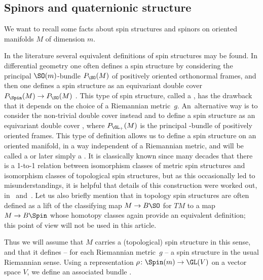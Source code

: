 \subsection{Spinors and quaternionic structure}\label{subsec.quaternionic-structures}

We want to recall some facts about spin structures and spinors on oriented manifolds $M$ of dimension $m$.

In the literature several equivalent definitions of spin structures may be found.
In differential geometry one often defines a spin structure by considering the principal $\SO(m)$-bundle $P_\SO(M)$ of positively oriented orthonormal frames, and then one defines a spin structure as an equivariant double cover $P_\Spin(M) \to P_\SO(M)$ \cite{friedrich-book,lawson.michelsohn:89}.
This type of spin structure, called a , has the drawback that it depends on the choice of a Riemannian metric~$g$.
An~alternative way is to consider the non-trivial double cover  instead and to define a spin structure as an equivariant double cover , where $P_{\GL_+}(M)$ is the principal -bundle of positively oriented frames. This type of definition allows us to define a spin structure on an oriented manifold, in a way independent of a Riemannian metric, and will be called a  or later simply a .
It is classically known since many decades that there is a 1-to-1 relation between isomorphism classes of metric spin structures and isomorphism classes of topological spin structures, but as this occasionally led to misunderstandings, it is helpful that details of this construction were worked out, \eg in~\cite{swift-parttwo} and~\cite[Section~2.2]{ammann.humbert:2008}.
Let us also briefly mention that in topology spin structures are often defined as a lift of the classifying map $M\to B\SO$ for $TM$ to a map $M\to B\Spin$ whose homotopy classes again provide an equivalent definition; this point of view will not be used in this article.

Thus we will assume that $M$ carries a (topological) spin structure in this sense, and that it defines -- for each Riemannian metric~$g$ -- a spin structure  in the usual Riemannian sense. Using a representation
$\rho\colon\Spin(m)\to \GL(V)$ on a vector space $V$,
we define an associated bundle .

